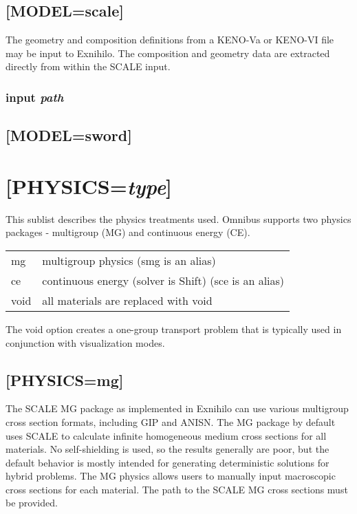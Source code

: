 \documentclass[10pt]{article}
\begin{document}
\subsection{[MODEL=scale]}
The geometry and composition definitions from a KENO-Va or KENO-VI file may be input to Exnihilo. The composition and geometry data are extracted directly from within the SCALE input. 

\subsubsection{input \textit{path}}

\subsection{[MODEL=sword]}

\section{[PHYSICS=\textit{type}]}
This sublist describes the physics treatments used. Omnibus supports two physics packages - multigroup (MG) and continuous energy (CE). 

\begin{tabular}{ll}
mg & multigroup physics (smg is an alias)\\
ce & continuous energy (solver is Shift) (sce is an alias)\\
void & all materials are replaced with void\\
\end{tabular}

The void option creates a one-group transport problem that is typically used in conjunction with visualization modes. 

\subsection{[PHYSICS=mg]}
The SCALE MG package as implemented in Exnihilo can use various multigroup cross section formats, including GIP and ANISN. The MG package by default uses SCALE to calculate infinite homogeneous medium cross sections for all materials. No self-shielding is used, so the results generally are poor, but the default behavior is mostly intended for generating deterministic solutions for hybrid problems. The MG physics allows users to manually input macroscopic cross sections for each material. The path to the SCALE MG cross sections must be provided. 
\end{document}
